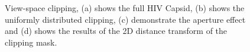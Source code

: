 \begin{figure}[t]
\centering
{}
\caption{\label{fig:df}View-space clipping, (a) shows the full HIV Capsid, (b) shows the uniformly distributed clipping, (c) demonstrate the aperture effect and (d) shows the results of the 2D distance transform of the clipping mask.}
\vspace{-2mm}
\end{figure}

